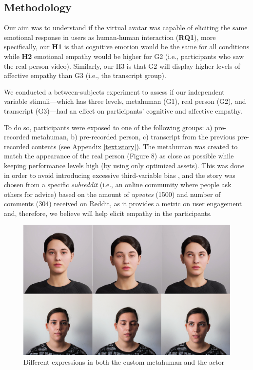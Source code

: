 \subsection{Methodology}
Our aim was to understand if the virtual avatar was capable of eliciting the same emotional response in users as human-human interaction (\textbf{RQ1}), more specifically, our \textbf{H1} is that cognitive emotion would be the same for all conditions while \textbf{H2} emotional empathy would be higher for G2 (i.e., participants who saw the real person video). Similarly, our H3 is that G2 will display higher levels of affective empathy than G3 (i.e., the transcript group).

We conducted a between-subjects experiment to assess if our independent variable stimuli---which has three levels, metahuman (G1), real person (G2), and transcript (G3)---had an effect on participants' cognitive and affective empathy.

To do so, participants were exposed to one of the following groups: a) pre-recorded metahuman, b) pre-recorded person, c) transcript from the previous pre-recorded contents (see Appendix \ref{text:story}). The metahuman was created to match the appearance of the real person (Figure 8) as close as possible while keeping performance levels high (by using only optimized assets). This was done in order to avoid introducing excessive third-variable bias \cite{ROT19}, and the story was chosen from a specific \textit{subreddit} (i.e., an online community where people ask others for advice) based on the amount of \textit{upvotes} (1500) and number of comments (304) received on Reddit, as it provides a metric on user engagement and, therefore, we believe will help elicit empathy in the participants.

\begin{figure}[h!]
\includegraphics[width=\textwidth]{figures/personavatar.jpg}
\centering
\caption{Different expressions in both the custom metahuman and the actor}
\end{figure}


